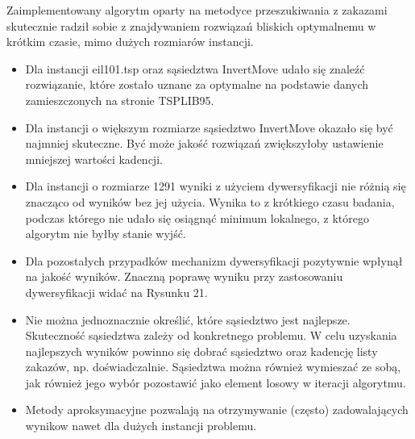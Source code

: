 \documentclass[a4paper,11pt]{article}
\begin{document}
Zaimplementowany algorytm oparty na metodyce przeszukiwania z zakazami skutecznie radził sobie z znajdywaniem rozwiązań bliskich optymalnemu w krótkim czasie, mimo dużych rozmiarów instancji. 
\begin{itemize}
\item Dla instancji eil101.tsp oraz sąsiedztwa InvertMove udało się znaleźć rozwiązanie, które zostało uznane za optymalne na podstawie danych zamieszczonych na stronie TSPLIB95.
\item Dla instancji o większym rozmiarze sąsiedztwo InvertMove okazało się być najmniej skuteczne. Być może jakość rozwiązań zwiększyłoby ustawienie mniejszej wartości kadencji.
\item Dla instancji o rozmiarze 1291 wyniki z użyciem dywersyfikacji nie różnią się znacząco od wyników bez jej użycia. Wynika to z krótkiego czasu badania, podczas którego nie udało się osiągnąć minimum lokalnego, z którego algorytm nie byłby stanie wyjść.
\item Dla pozostałych przypadków mechanizm dywersyfikacji pozytywnie wpłynął na jakość wyników. Znaczną poprawę wyniku przy zastosowaniu dywersyfikacji widać na Rysunku 21.
\item Nie można jednoznacznie określić, które sąsiedztwo jest najlepsze. Skuteczność sąsiedztwa zależy od konkretnego problemu. W celu uzyskania najlepszych wyników powinno się dobrać sąsiedztwo oraz kadencję listy zakazów, np. doświadczalnie. Sąsiedztwa można również wymieszać ze sobą, jak również jego wybór pozostawić jako element losowy w iteracji algorytmu.
\item Metody aproksymacyjne pozwalają na otrzymywanie (często) zadowalających wynikow nawet dla dużych instancji problemu.
\end{itemize}
\end{document}
